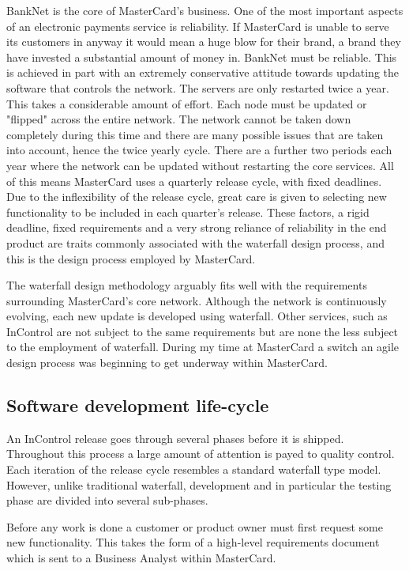 \documentclass[a4paper, 11pt, titlepage]{article}
\begin{document}
BankNet is the core of MasterCard’s business. One of the most important aspects of an electronic payments service is reliability. If MasterCard is unable to serve its customers in anyway it would mean a huge blow for their brand, a brand they have invested a substantial amount of money in. BankNet must be reliable. This is achieved in part with an extremely conservative attitude towards updating the software that controls the network. The servers are only restarted twice a year. This takes a considerable amount of effort. Each node must be updated or "flipped" across the entire network. The network cannot be taken down completely during this time and there are many possible issues that are taken into account, hence the twice yearly cycle. There are a further two periods each year where the network can be updated without restarting the core services. All of this means MasterCard uses a quarterly release cycle, with fixed deadlines. Due to the inflexibility of the release cycle, great care is given to selecting new functionality to be included in each quarter’s release. These factors, a rigid deadline, fixed requirements and a very strong reliance of reliability in the end product are traits commonly associated with the waterfall design process, and this is the design process employed by MasterCard. 
 
The waterfall design methodology arguably fits well with the requirements surrounding MasterCard’s core network. Although the network is continuously evolving, each new update is developed using waterfall. Other services, such as InControl are not subject to the same requirements but are none the less subject to the employment of waterfall. During my time at MasterCard a switch an agile design process was beginning to get underway within MasterCard. 
 
\subsection{Software development life-cycle}

An InControl release goes through several phases before it is shipped. Throughout this process a large amount of attention is payed to quality control. Each iteration of the release cycle resembles a standard waterfall type model. However, unlike traditional waterfall, development and in particular the testing phase are divided into several sub-phases.

Before any work is done a customer or product owner must first request some new functionality. This takes the form of a high-level requirements document which is sent to a Business Analyst within MasterCard.
\end{document}
